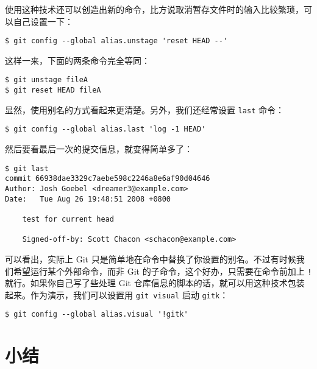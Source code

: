 \documentclass[a4paper]{book}
\begin{document}
使用这种技术还可以创造出新的命令，比方说取消暂存文件时的输入比较繁琐，可以自己设置一下：

\begin{shaded}\begin{verbatim}
$ git config --global alias.unstage 'reset HEAD --'
\end{verbatim}\end{shaded}

这样一来，下面的两条命令完全等同：

\begin{shaded}\begin{verbatim}
$ git unstage fileA
$ git reset HEAD fileA
\end{verbatim}\end{shaded}

显然，使用别名的方式看起来更清楚。另外，我们还经常设置 \texttt{last} 命令：

\begin{shaded}\begin{verbatim}
$ git config --global alias.last 'log -1 HEAD'
\end{verbatim}\end{shaded}

然后要看最后一次的提交信息，就变得简单多了：

\begin{shaded}\begin{verbatim}
$ git last
commit 66938dae3329c7aebe598c2246a8e6af90d04646
Author: Josh Goebel <dreamer3@example.com>
Date:   Tue Aug 26 19:48:51 2008 +0800

    test for current head

    Signed-off-by: Scott Chacon <schacon@example.com>
\end{verbatim}\end{shaded}

可以看出，实际上 Git 只是简单地在命令中替换了你设置的别名。不过有时候我们希望运行某个外部命令，而非 Git 的子命令，这个好办，只需要在命令前加上 \texttt{!} 就行。如果你自己写了些处理 Git 仓库信息的脚本的话，就可以用这种技术包装起来。作为演示，我们可以设置用 \texttt{git visual} 启动 \texttt{gitk}：

\begin{shaded}\begin{verbatim}
$ git config --global alias.visual '!gitk'
\end{verbatim}\end{shaded}

\section{小结}
\end{document}
